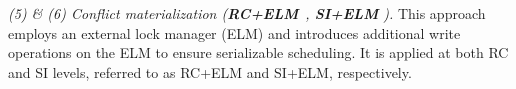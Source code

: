 
\textit{(5) \& (6) Conflict materialization (\textbf{RC+ELM}~\cite{DBLP:conf/aiccsa/AlomariF15}, \textbf{SI+ELM} \cite{DBLP:conf/icde/AlomariCFR08}).} 
This approach employs an external lock manager (ELM) and introduces additional write operations on the ELM to ensure serializable scheduling. It is applied at both RC and SI levels, referred to as RC+ELM and SI+ELM, respectively.  


